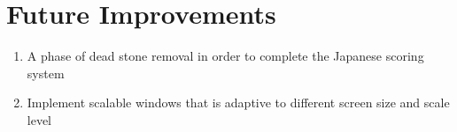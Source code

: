 \section{Future Improvements}

\begin{enumerate}
	\item A phase of dead stone removal in order to complete the Japanese scoring system
	\item Implement scalable windows that is adaptive to different screen size and scale level
\end{enumerate}
